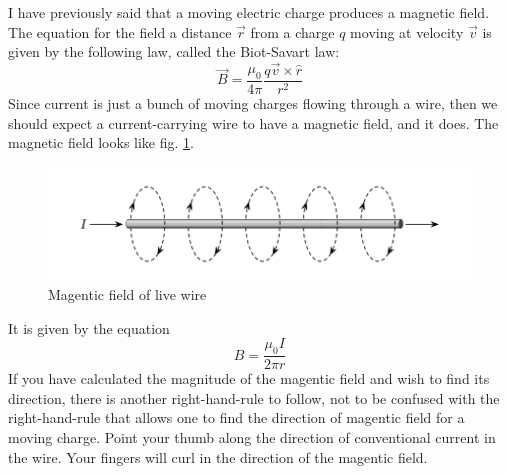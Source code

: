 \documentclass[nobib]{tufte-handout}
\begin{document}
I have previously said that a moving electric charge produces a magnetic field. 
The equation for the field a distance $\vec{r}$ from a charge $q$ moving at velocity $\vec{v}$ is given by the following law,
called the Biot-Savart law:
\[\vec{B} = \frac{\mu_0}{4 \pi}\frac{q\vec{v}\times \hat{r}}{r^2}\]
Since current is just a bunch of moving charges flowing through a wire, 
then we should expect a current-carrying wire to have a magnetic field, 
and it does. 
The magnetic field looks like fig. \ref{fig:wire}. 
\begin{figure}
    \caption{Magentic field of live wire}
    \label{fig:wire}
    \includegraphics{images/wire.png}
\end{figure}
It is given by the equation
\[B = \frac{\mu_0 I}{2\pi r}\]
If you have calculated the magnitude of the magentic field and wish 
to find its direction, there is another right-hand-rule to follow, 
not to be confused with the right-hand-rule that allows one to find 
the direction of magentic field for a moving charge. 
Point your thumb along the direction of conventional current 
in the wire. Your fingers will curl in the direction of the magentic 
field. 
\end{document}
